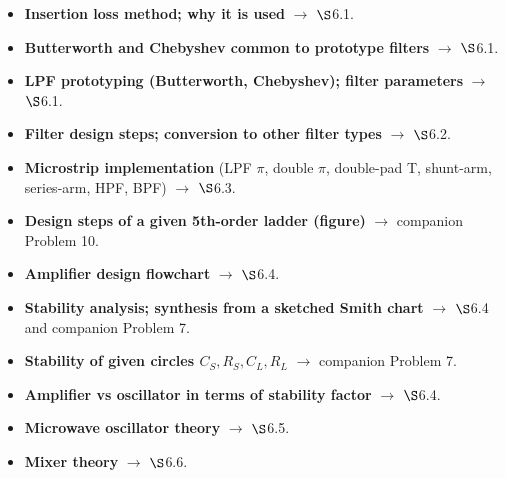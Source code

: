 \vspace{2pt}


\begin{itemize}
  \item \textbf{Insertion loss method; why it is used} $\rightarrow$ $\S$6.1.
  \item \textbf{Butterworth and Chebyshev common to prototype filters} $\rightarrow$ $\S$6.1.
  \item \textbf{LPF prototyping (Butterworth, Chebyshev); filter parameters}
    $\rightarrow$ $\S$6.1. 
  \item \textbf{Filter design steps; conversion to other filter types} $\rightarrow$ $\S$6.2.
  \item \textbf{Microstrip implementation} (LPF $\pi$, double $\pi$, double-pad T, shunt-arm,
    series-arm, HPF, BPF) $\rightarrow$ $\S$6.3. 
  \item \textbf{Design steps of a given 5th-order ladder (figure)} $\rightarrow$ companion
    Problem 10. 
  \item \textbf{Amplifier design flowchart} $\rightarrow$ $\S$6.4. 
  \item \textbf{Stability analysis; synthesis from a sketched Smith chart} $\rightarrow$
    $\S$6.4 and companion Problem 7. 
  \item \textbf{Stability of given circles $C_S, R_S, C_L, R_L$} $\rightarrow$ companion
    Problem 7. 
  \item \textbf{Amplifier vs oscillator in terms of stability factor} $\rightarrow$ $\S$6.4.
  \item \textbf{Microwave oscillator theory} $\rightarrow$ $\S$6.5. 
  \item \textbf{Mixer theory} $\rightarrow$ $\S$6.6. 
\end{itemize}

